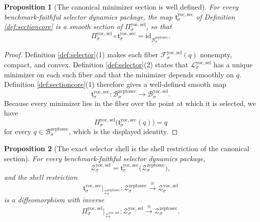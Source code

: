 \documentclass[11pt]{article}
\newcommand{\ZeptoSectionBody}[1]{\mathcal B_{#1}^{\mathrm{zeptosec}}}
\newcommand{\ZeptoSectionShell}[1]{\mathcal Z_{#1}^{\mathrm{zeptosec}}}
\newcommand{\YoctoMinSection}[1]{\mathfrak t_{#1}^{\mathrm{yoc,sec}}}
\newcommand{\YoctoSelectorBody}[1]{\mathcal B_{#1}^{\mathrm{yoc,sel}}}
\newcommand{\YoctoSelectorProj}[1]{\Pi_{#1}^{\mathrm{yoc,sel}}}
\newcommand{\YoctoSelectorFiber}[2]{\mathcal F_{#1}^{\mathrm{yoc,sel}}(#2)}
\newcommand{\YoctoSelectorFunctional}[1]{\mathscr L_{#1}^{\mathrm{yoc,sel}}}
\newcommand{\YoctoSelectorShell}[1]{\mathcal Z_{#1}^{\mathrm{yoc,sel}}}
\newtheorem{proposition}{Proposition}
\begin{document}
\begin{proposition}[The canonical minimizer section is well defined]
\label{prop:section}
For every benchmark-faithful selector dynamics package, the map \(\YoctoMinSection{\sigma}\) of Definition \ref{def:sectioncore} is a smooth section of \(\YoctoSelectorProj{\sigma}\), so that
\[
\YoctoSelectorProj{\sigma}\circ\YoctoMinSection{\sigma}
=
\mathrm{id}_{\ZeptoSectionBody{\sigma}}.
\]
\end{proposition}

\begin{proof}
Definition \ref{def:selector}(1) makes each fiber \(\YoctoSelectorFiber{\sigma}{q}\) nonempty, compact, and convex. Definition \ref{def:selector}(2) states that \(\YoctoSelectorFunctional{\sigma}\) has a unique minimizer on each such fiber and that the minimizer depends smoothly on \(q\). Definition \ref{def:sectioncore}(1) therefore gives a well-defined smooth map
\[
\YoctoMinSection{\sigma}:\ZeptoSectionBody{\sigma}\to\YoctoSelectorBody{\sigma}.
\]
Because every minimizer lies in the fiber over the point at which it is selected, we have
\[
\YoctoSelectorProj{\sigma}\bigl(\YoctoMinSection{\sigma}(q)\bigr)=q
\]
for every \(q\in\ZeptoSectionBody{\sigma}\), which is the displayed identity.
\end{proof}

\begin{proposition}[The exact selector shell is the shell restriction of the canonical section]
\label{prop:shell}
For every benchmark-faithful selector dynamics package,
\[
\YoctoSelectorShell{\sigma}
=
\YoctoMinSection{\sigma}\bigl(\ZeptoSectionShell{\sigma}\bigr),
\]
and the shell restriction
\[
\YoctoMinSection{\sigma}\big|_{\ZeptoSectionShell{\sigma}}
:
\ZeptoSectionShell{\sigma}\xrightarrow{\cong}\YoctoSelectorShell{\sigma}
\]
is a diffeomorphism with inverse
\[
\YoctoSelectorProj{\sigma}\big|_{\YoctoSelectorShell{\sigma}}
:
\YoctoSelectorShell{\sigma}\xrightarrow{\cong}\ZeptoSectionShell{\sigma}.
\]
\end{proposition}
\end{document}
